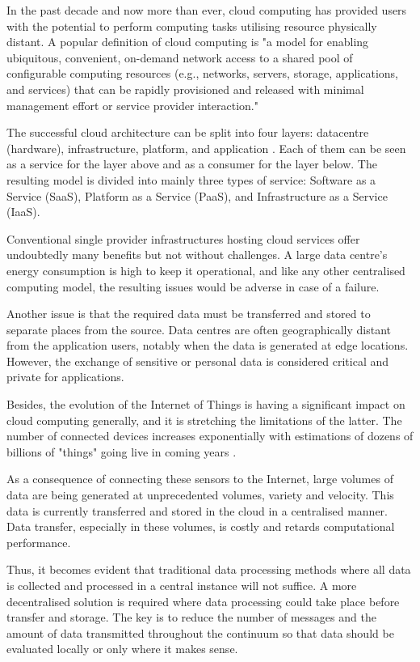 \documentclass{ieeeaccess}
\begin{document}
In the past decade and now more than ever, cloud computing has provided users with the potential to perform computing tasks utilising resource physically distant. A popular definition of cloud computing \cite{cloud-def} is "a model for enabling ubiquitous, convenient, on-demand network access to a shared pool of configurable computing resources (e.g., networks, servers, storage, applications, and services) that can be rapidly provisioned and released with minimal management effort or service provider interaction."

The successful cloud architecture can be split into four layers: datacentre (hardware), infrastructure, platform, and application \cite{cloud-computing}. Each of them can be seen as a service for the layer above and as a consumer for the layer below. The resulting model is divided into mainly three types of service: Software as a Service (SaaS), Platform as a Service (PaaS), and Infrastructure as a Service (IaaS).

Conventional single provider infrastructures hosting cloud services offer undoubtedly many benefits but not without challenges. A large data centre's energy consumption is high to keep it operational, and like any other centralised computing model, the resulting issues would be adverse in case of a failure.

Another issue is that the required data must be transferred and stored to separate places from the source. Data centres are often geographically distant from the application users, notably when the data is generated at edge locations. However, the exchange of sensitive or personal data is considered critical and private for applications.

Besides, the evolution of the Internet of Things is having a significant impact on cloud computing generally, and it is stretching the limitations of the latter. The number of connected devices increases exponentially with estimations of dozens of billions of "things" going live in coming years \cite{gartner-iot}.

As a consequence of connecting these sensors to the Internet, large volumes of data are being generated at unprecedented volumes, variety and velocity. This data is currently transferred and stored in the cloud in a centralised manner. Data transfer, especially in these volumes, is costly and retards computational performance.

Thus, it becomes evident that traditional data processing methods where all data is collected and processed in a central instance will not suffice. A more decentralised solution is required where data processing could take place before transfer and storage. The key is to reduce the number of messages and the amount of data transmitted throughout the continuum so that data should be evaluated locally or only where it makes sense.
\end{document}
